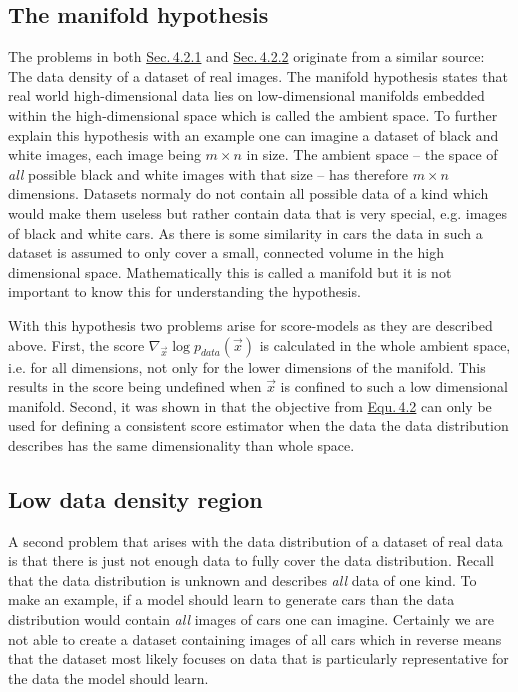 \subsection{The manifold hypothesis} \label{sec:4.2.1}
The problems in both \hyperref[sec:4.2.1]{Sec.\,4.2.1} and \hyperref[sec:4.2.2]{Sec.\,4.2.2} originate from a similar source: The data density of a dataset of real images. The manifold hypothesis states that real world high-dimensional data lies on low-dimensional manifolds embedded within the high-dimensional space which is called the ambient space. To further explain this hypothesis with an example one can imagine a dataset of black and white images, each image being $m\times n$ in size. The ambient space – the space of \textit{all} possible black and white images with that size – has therefore $m\times n$ dimensions. Datasets normaly do not contain all possible data of a kind which would make them useless but rather contain data that is very special, e.g. images of black and white cars. As there is some similarity in cars the data in such a dataset is assumed to only cover a small, connected volume in the high dimensional space. Mathematically this is called a manifold but it is not important to know this for understanding the hypothesis.

With this hypothesis two problems arise for score-models as they are described above. First, the score $\nabla_{\vec{x}}\log p_{data}(\vec{x})$ is calculated in the whole ambient space, i.e. for all dimensions, not only for the lower dimensions of the manifold. This results in the score being undefined when $\vec{x}$ is confined to such a low dimensional manifold. Second, it was shown in \cite{score_matching_original} that the objective from \hyperref[equ:4.2]{Equ.\,4.2} can only be used for defining a consistent score estimator when the data the data distribution describes has the same dimensionality than whole space.
%
\subsection{Low data density region}\label{sec:4.2.2}
A second problem that arises with the data distribution of a dataset of real data is that there is just not enough data to fully cover the data distribution. Recall that the data distribution is unknown and describes \textit{all} data of one kind. To make an example, if a model should learn to generate cars than the data distribution would contain \textit{all} images of cars one can imagine. Certainly we are not able to create a dataset containing images of all cars which in reverse means that the dataset most likely focuses on data that is particularly representative for the data the model should learn.

